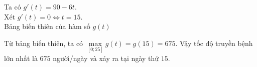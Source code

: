 \begin{bt}
{\begin{enumerate}
			Ta có $g'(t)=90-6t$. \\
			Xét $g'(t)=0 \Leftrightarrow t=15$. \\
			Bảng biến thiên của hàm số $g(t)$
			\begin{center}
			\end{center}
			Từ bảng biến thiên, ta có $\max\limits_{[0;25]} g(t)=g(15)=675$.
			Vậy tốc độ truyền bệnh lớn nhất là $675$ người/ngày và xảy ra tại ngày thứ $15$.
		\end{enumerate}
	}
\end{bt}

